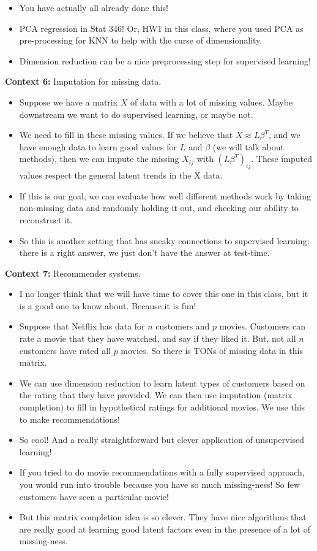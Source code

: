\begin{list}{}{}
\begin{itemize}
\item You have actually all already done this!
\item PCA regression in Stat 346! Or, HW1 in this class, where you used PCA as pre-processing for KNN to help with the curse of dimensionality. 	
\item Dimension reduction can be a nice preprocessing step for supervised learning! 
\end{itemize}
\item[\textbf{Context 6:} ] Imputation for missing data. 
\begin{itemize}
\item Suppose we have a matrix $X$ of data with a lot of missing values. Maybe downstream we want to do supervised learning, or maybe not.
\item We need to fill in these missing values. If we believe that $X \approx L \beta^T$, and we have enough data to learn good values for $L$ and $\beta$ (we will talk about methods), then we can impute the missing $X_{ij}$ with $(L \beta^T)_{ij}$. These imputed values respect the general latent trends in the X data. 
\item If this is our goal, we can evaluate how well different methods work by taking non-missing data and randomly holding it out, and checking our ability to reconstruct it.
\item So this is another setting that has sneaky connections to supervised learning: there is a right answer, we just don't have the answer at test-time. 
\end{itemize}
\item[\textbf{Context 7:} ] Recommender systems.
\begin{itemize}
\item I no longer think that we will have time to cover this one in this class, but it is a good one to know about. Because it is fun! 
\item Suppose that Netflix has data for $n$ customers and $p$ movies. Customers can rate a movie that they have watched, and say if they liked it. But, not all $n$ customers have rated all $p$ movies. So there is TONs of missing data in this matrix.
\item We can use dimension reduction to learn latent types of customers based on the rating that they have provided. We can then use imputation (matrix completion) to fill in hypothetical ratings for additional movies. We use this to make recommendations! 
\item So cool! And a really straightforward but clever application of unsupervised learning! 
\item If you tried to do movie recommendations with a fully supervised approach, you would run into trouble because you have so much missing-ness! So few customers have seen a particular movie!
\item But this matrix completion idea is so clever. They have nice algorithms that are really good at learning good latent factors even in the presence of a lot of missing-ness. 
\end{itemize}

\end{list}

